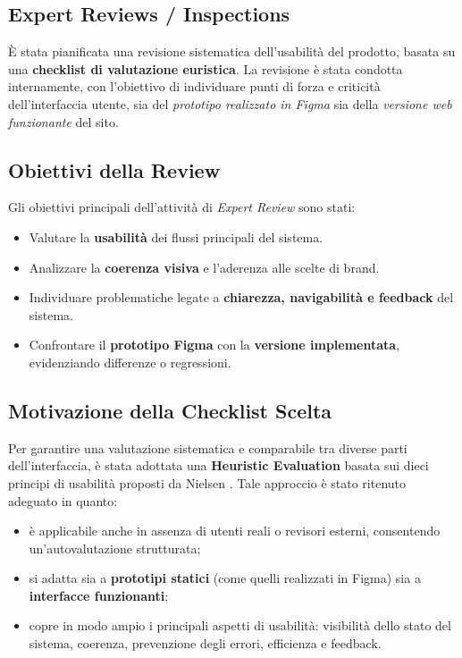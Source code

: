 \subsection{Expert Reviews / Inspections}

È stata pianificata una revisione sistematica dell’usabilità del prodotto, basata su una \textbf{checklist di valutazione euristica}.  
La revisione è stata condotta internamente, con l’obiettivo di individuare punti di forza e criticità dell’interfaccia utente, sia del \textit{prototipo realizzato in Figma} sia della \textit{versione web funzionante} del sito.

\subsection*{Obiettivi della Review}

Gli obiettivi principali dell’attività di \textit{Expert Review} sono stati:
\begin{itemize}
    \item Valutare la \textbf{usabilità} dei flussi principali del sistema.
    \item Analizzare la \textbf{coerenza visiva} e l’aderenza alle scelte di brand.
    \item Individuare problematiche legate a \textbf{chiarezza, navigabilità e feedback} del sistema.
    \item Confrontare il \textbf{prototipo Figma} con la \textbf{versione implementata}, evidenziando differenze o regressioni.
\end{itemize}

\subsection*{Motivazione della Checklist Scelta}

Per garantire una valutazione sistematica e comparabile tra diverse parti dell’interfaccia, è stata adottata una \textbf{Heuristic Evaluation} basata sui dieci principi di usabilità proposti da Nielsen \cite{nielsen1995}.  
Tale approccio è stato ritenuto adeguato in quanto:
\begin{itemize}
    \item è applicabile anche in assenza di utenti reali o revisori esterni, consentendo un’autovalutazione strutturata;  
    \item si adatta sia a \textbf{prototipi statici} (come quelli realizzati in Figma) sia a \textbf{interfacce funzionanti};  
    \item copre in modo ampio i principali aspetti di usabilità: visibilità dello stato del sistema, coerenza, prevenzione degli errori, efficienza e feedback.
\end{itemize}

